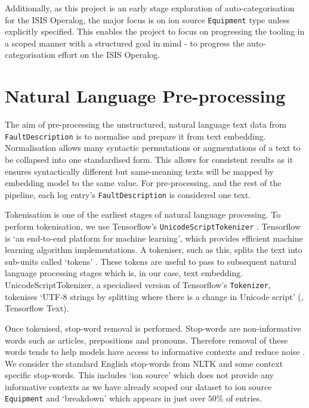 \documentclass[10pt,oneside]{report}
\begin{document}
Additionally, as this project is an early stage exploration of auto-categorisation for the ISIS Operalog, the major focus is on ion source \texttt{Equipment} type unless explicitly specified. This enables the project to focus on progressing the tooling in a scoped manner with a structured goal in mind - to progress the auto-categorisation effort on the ISIS Operalog.


\section{Natural Language Pre-processing}

The aim of pre-processing the unstructured, natural language text data from \texttt{FaultDescription} is to normalise and prepare it from text embedding. Normalisation allows many syntactic permutations or augmentations of a text to be collapsed into one standardised form. This allows for consistent results as it ensures syntactically different  but same-meaning texts will be mapped by embedding model to the same value. For pre-processing, and the rest of the pipeline, each log entry's \texttt{FaultDescription} is considered one text.


Tokenisation is one of the earliest stages of natural language processing. To perform tokenisation, we use Tensorflow's \texttt{UnicodeScriptTokenizer} \cite{tensorflow2015whitepaper}. Tensorflow is `an end-to-end platform for machine learning', which provides efficient machine learning algorithm implementations. A tokeniser, such as this, splits the text into sub-units called `tokens' \cite{gefenstette1999tokenization}. These tokens are useful to pass to subsequent natural language processing stages which is, in our case, text embedding. UnicodeScriptTokenizer, a specialised version of Tensorflow's \texttt{Tokenizer}, tokenises `UTF-8 strings by splitting where there is a change in Unicode script' (\cite{tensorflow2015whitepaper}, Tensorflow Text). 

Once tokenised, stop-word removal is performed. Stop-words are non-informative words such as articles, prepositions and pronouns. Therefore removal of these words tends to help models have access to informative contexts and reduce noise \cite{silva2003importance}. We consider the standard English stop-words from NLTK \cite{bird2009natural} and some context specific stop-words. This includes `ion source' which does not provide any informative contexts as we have already scoped our dataset to ion source \texttt{Equipment} and `breakdown' which appears in just over $50\%$ of entries. 
\end{document}
